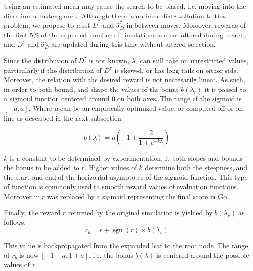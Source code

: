 \documentclass{ecai2014}
\newcommand{\sgn}{\mathop{\mathrm{sgn}}}
\begin{document}
Using an estimated mean may cause the search to be biased, i.e. moving into the dierction of faster games. Although there is no immediate sollution to this problem, we propose to reset $\bar{D}^\tau$ and $\hat{\sigma}^\tau_D$ in between moves. Moreover, rewards of the first $5\%$ of the expected number of simulations are not altered during search, and $\bar{D}^\tau$ and $\hat{\sigma}^\tau_D$ are updated during this time without altered selection.

Since the distribution of $D^\tau$ is not known, $\lambda_r$ can still take on unrestricted values, particularly if the distribution of $D^\tau$ is skewed, or has long tails on either side. Moreover, the relation with the desired reward is not neccesarily linear. As such, in order to both bound, and shape the values of the bonus $b(\lambda_r)$ it is passed to a sigmoid function centered around $0$ on both axes. The range of the sigmoid is $[-a, a]$. Where $a$ can be an empirically optimized value, or computed off or on-line as described in the next subsection.

\begin{equation}
b(\lambda)=a\left(-1+\frac{2}{1+e^{-k\lambda}}\right)
\label{eq:sigmoid}
\end{equation}

$k$ is a constant to be determined by experimentation, it both slopes and bounds the bonus to be added to $r$. Higher values of $k$ determine both the steepness, and the start and end of the horizontal asymptotes of the sigmoid function. This type of function is commonly used to smooth reward values of evaluation functions. Moreover in \cite{shibahara2008combining} $r$ was replaced by a sigmoid representing the final score in Go.

Finally, the reward $r$ returned by the original simulation is yielded by $b(\lambda_r)$ as follows:
\begin{equation}
r_b=r+\sgn(r)\times b(\lambda_r)
\end{equation}

This value is backpropagated from the expanded leaf to the root node. The range of $r_b$ is now $[-1-a, 1+a]$, i.e. the bonus $b(\lambda)$ is centered around the possible values of $r$.
\end{document}
